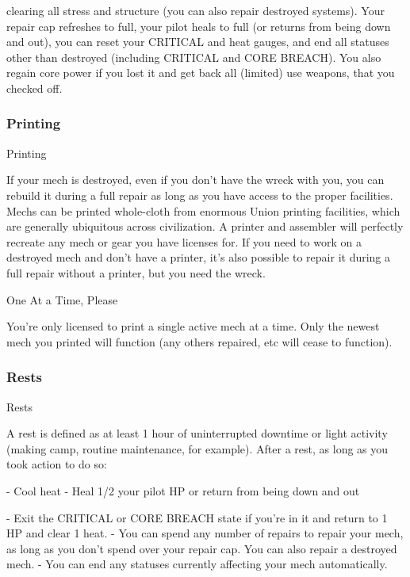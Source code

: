 clearing all stress and structure (you can also repair destroyed systems). Your repair cap
refreshes to full, your pilot heals to full (or returns from being down and out), you can reset
your CRITICAL and heat gauges, and end all statuses other than destroyed (including
CRITICAL and CORE BREACH). You also regain core power if you lost it and get back all
(limited) use weapons, that you checked off.

\subsubsection{Printing}
                                                   Printing

If your mech is destroyed, even if you don’t have the wreck with you, you can rebuild it during a
full repair as long as you have access to the proper facilities. Mechs can be printed whole-cloth
from enormous Union printing facilities, which are generally ubiquitous across civilization. A
printer and assembler will perfectly recreate any mech or gear you have licenses for. If you need
to work on a destroyed mech and don’t have a printer, it’s also possible to repair it during a full
repair without a printer, but you need the wreck.


                                            One At a Time, Please

You’re only licensed to print a single active mech at a time. Only the newest mech you printed
will function (any others repaired, etc will cease to function).

\subsubsection{Rests}
                                                     Rests

A rest is defined as at least 1 hour of uninterrupted downtime or light activity (making camp,
routine maintenance, for example). After a rest, as long as you took action to do so:

             -   Cool heat
             -    Heal 1/2 your pilot HP or return from being down and out

             -    Exit the CRITICAL or CORE BREACH state if you’re in it and return to 1 HP and
                 clear 1 heat.
             -   You can spend any number of repairs to repair your mech, as long as you don’t
                 spend over your repair cap. You can also repair a destroyed mech.
             -   You can end any statuses currently affecting your mech automatically.


